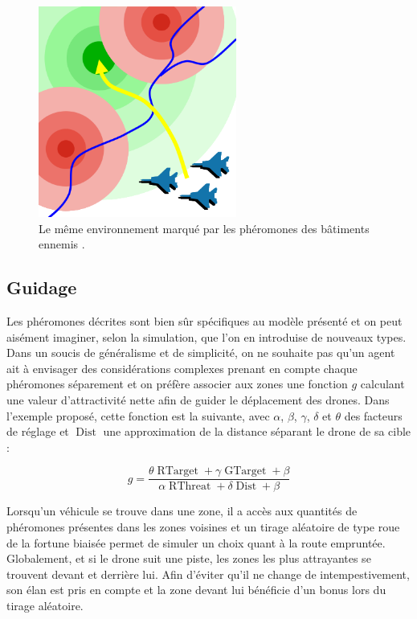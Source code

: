 \documentclass[12pt]{article}
\begin{document}
\begin{figure}[H]
  \centering

  \includegraphics[width=6.5cm]{terrain_field.png}

  \caption{Le même environnement marqué par les phéromones des
    bâtiments ennemis \cite{parunak}.}
  \label{field}
\end{figure}

\subsection{Guidage}

Les phéromones décrites sont bien sûr spécifiques au modèle présenté
et on peut aisément imaginer, selon la simulation, que l'on en
introduise de nouveaux types. Dans un soucis de généralisme et de
simplicité, on ne souhaite pas qu'un agent ait à envisager des
considérations complexes prenant en compte chaque phéromones
séparement et on préfère associer aux zones une fonction $g$ calculant
une valeur d'attractivité nette afin de guider le déplacement des
drones. Dans l'exemple proposé, cette fonction est la suivante, avec
$\alpha$, $\beta$, $\gamma$, $\delta$ et $\theta$ des facteurs de
réglage et $\operatorname{Dist}$ une approximation de la distance
séparant le drone de sa cible :

\begin{equation}
  g = \frac{ \theta \operatorname{RTarget} + \gamma
  \operatorname{GTarget} + \beta}{\alpha \operatorname{RThreat} + \delta
  \operatorname{Dist} + \beta}
  \label{g}
\end{equation}

Lorsqu'un véhicule se trouve dans une zone, il a accès aux quantités
de phéromones présentes dans les zones voisines et un tirage aléatoire
de type roue de la fortune biaisée permet de simuler un choix quant à
la route empruntée. Globalement, et si le drone suit une piste, les
zones les plus attrayantes se trouvent devant et derrière lui. Afin
d'éviter qu'il ne change de intempestivement, son élan est pris en
compte et la zone devant lui bénéficie d'un bonus lors du tirage
aléatoire.
\end{document}

